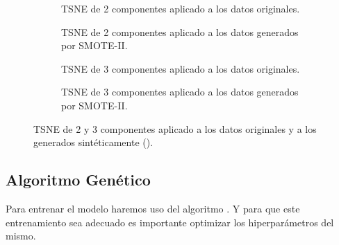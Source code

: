             \begin{figure}
                \centering
                \begin{subfigure}[b]{0.4\textwidth}
                    \centering
                    
                    \caption{TSNE de 2 componentes aplicado a los datos originales.}
                    \label{TSNEImages:Clean2D}
                \end{subfigure}
                \begin{subfigure}[b]{0.4\textwidth}
                    \centering
                    
                    \caption{TSNE de 2 componentes aplicado a los datos generados por SMOTE-II.}
                    \label{TSNEImages:Train2D}

                \end{subfigure}
                \begin{subfigure}[b]{0.4\textwidth}
                    \centering
                    
                    \caption{TSNE de 3 componentes aplicado a los datos originales.}
                    \label{TSNEImages:Clean3D}
                \end{subfigure}
                \begin{subfigure}[b]{0.4\textwidth}
                    \centering
                    
                    \caption{TSNE de 3 componentes aplicado a los datos generados por SMOTE-II.}
                    \label{TSNEImages:Train3D}
                \end{subfigure}
                \caption{TSNE de 2 y 3 componentes aplicado a los datos originales y a los generados sintéticamente ().}
                \label{TSNEImages}
             \end{figure}



    \subsection{Algoritmo Genético}


        Para entrenar el modelo haremos uso del algoritmo . Y para que este entrenamiento sea adecuado es importante optimizar los hiperparámetros del mismo.\\


